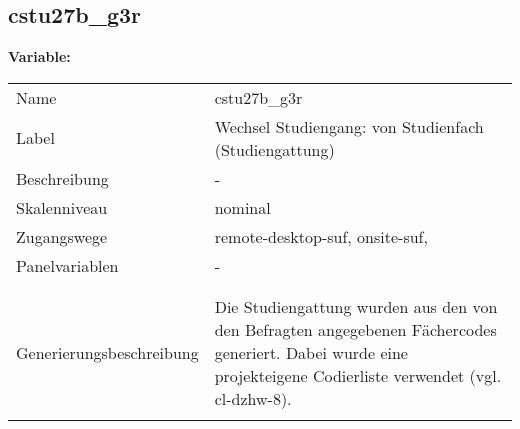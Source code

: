 	
	
	\subsection{cstu27b\_g3r}
	\label{subSection:cstu27b_g3r}

	\noindent\textbf{Variable:}\\
		\begin{tabular}{lL{11.3cm}}
			\label{tableVariable:cstu27b_g3r}
			Name & cstu27b\_g3r \\
			Label & Wechsel Studiengang: von Studienfach (Studiengattung) \\
			Beschreibung & - \\
			Skalenniveau & nominal \\
			Zugangswege &
				remote-desktop-suf,
				onsite-suf,
 \\
			Panelvariablen & -
			 \\
			 \\
 \\
					Generierungsbeschreibung & Die Studiengattung wurden aus den von den Befragten angegebenen Fächercodes generiert.  Dabei wurde eine projekteigene Codierliste verwendet (vgl. cl-dzhw-8).
				 \\	
			 \\
		\end{tabular}






